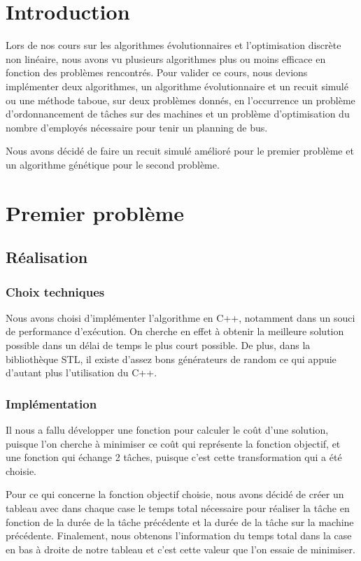 \documentclass{report}
\begin{document}
\tableofcontents

\chapter{Introduction}
\minitoc
Lors de nos cours sur les algorithmes évolutionnaires et l'optimisation discrète non linéaire, nous avons vu plusieurs
algorithmes plus ou moins efficace en fonction des problèmes rencontrés. Pour valider ce cours, nous devions implémenter
deux algorithmes, un algorithme évolutionnaire et un recuit simulé ou une méthode taboue, sur deux problèmes donnés, en
l'occurrence un problème d'ordonnancement de tâches sur des machines et un problème d'optimisation du nombre d'employés
nécessaire pour tenir un planning de bus.

Nous avons décidé de faire un recuit simulé amélioré pour le premier problème et un algorithme génétique pour le second problème.
\newpage

\chapter{Premier problème}
\minitoc
\section{Réalisation}
\subsection{Choix techniques}
Nous avons choisi d'implémenter l'algorithme en C++, notamment dans un souci de performance d’exécution. On cherche en
effet à obtenir la meilleure solution possible dans un délai de temps le plus court possible. De plus, dans la
bibliothèque STL, il existe d'assez bons générateurs de random ce qui appuie d'autant plus l'utilisation du C++.

\subsection{Implémentation}
Il nous a fallu développer une fonction pour calculer le coût d'une solution, puisque l'on cherche à minimiser ce coût
qui représente la fonction objectif, et une fonction qui échange 2 tâches, puisque c'est cette transformation qui a été
choisie.

Pour ce qui concerne la fonction objectif choisie, nous avons décidé de créer un tableau avec dans chaque case le temps
total nécessaire pour réaliser la tâche en fonction de la durée de la tâche précédente et la durée de la tâche sur la
machine précédente. Finalement, nous obtenons l'information du temps total dans la case en bas à droite de notre tableau et c'est cette valeur que l'on essaie de minimiser.
\end{document}
